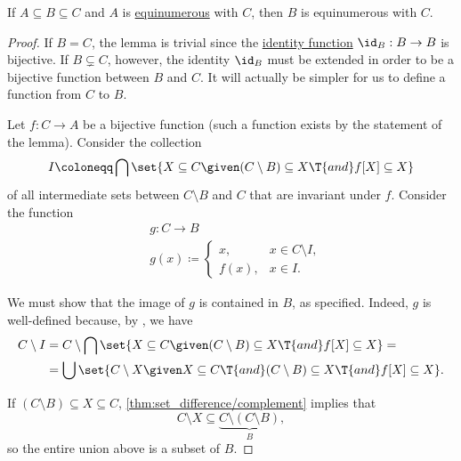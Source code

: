 \begin{lemma}\label{thm:three_equinumerous_sets_lemma}
  If \( A \subseteq B \subseteq C \) and \( A \) is \hyperref[def:equinumerosity]{equinumerous} with \( C \), then \( B \) is equinumerous with \( C \).
\end{lemma}
\begin{proof}
  If \( B = C \), the lemma is trivial since the \hyperref[def:set_valued_function/identity]{identity function} \( \id_B: B \to B \) is bijective. If \( B \subsetneq C \), however, the identity \( \id_B \) must be extended in order to be a bijective function between \( B \) and \( C \). It will actually be simpler for us to define a function from \( C \) to \( B \).

  Let \( f: C \to A \) be a bijective function (such a function exists by the statement of the lemma). Consider the collection
  \begin{equation*}
    I \coloneqq \bigcap\set{ X \subseteq C \given (C \setminus B) \subseteq X \T{and} f[X] \subseteq X }
  \end{equation*}
  of all intermediate sets between \( C \setminus B \) and \( C \) that are invariant under \( f \). Consider the function
  \begin{equation*}
    \begin{aligned}
      &g: C \to B \\
      &g(x) \coloneqq \begin{cases}
        x,    &x \in C \setminus I, \\
        f(x), &x \in I.
      \end{cases}
    \end{aligned}
  \end{equation*}

   We must show that the image of \( g \) is contained in \( B \), as specified. Indeed, \( g \) is well-defined because, by , we have
  \begin{align*}
    C \setminus I
    &=
    C \setminus \bigcap\set{ X \subseteq C \given (C \setminus B) \subseteq X \T{and} f[X] \subseteq X }
    = \\ &=
    \bigcup\set{ C \setminus X \given X \subseteq C \T{and} (C \setminus B) \subseteq X \T{and} f[X] \subseteq X }.
  \end{align*}

  If \( (C \setminus B) \subseteq X \subseteq C \), \cref{thm:set_difference/complement} implies that
  \begin{equation*}
    C \setminus X \subseteq \underbrace{C \setminus (C \setminus B)}_B,
  \end{equation*}
  so the entire union above is a subset of \( B \).


\end{proof}
